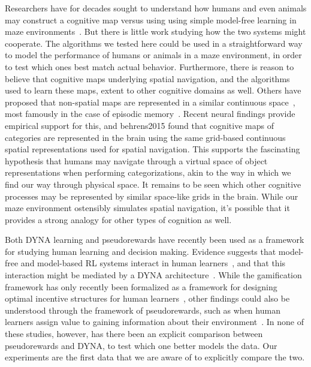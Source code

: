 \documentclass[notitlepage]{article}
\begin{document}
Researchers have for decades sought to understand how humans and even animals may construct a cognitive map versus using using simple model-free learning in maze environments~\cite{tolman1948cognitive,}. But there is little work studying how the two systems might cooperate. The algorithms we tested here could be used in a straightforward way to model the performance of humans or animals in a maze environment, in order to test which ones best match actual behavior. Furthermore, there is reason to believe that cognitive maps underlying spatial navigation, and the algorithms used to learn these maps, extent to other cognitive domains as well. Others have proposed that non-spatial maps are represented in a similar continuous space~\cite{buzsaki2013memory,tolman1948cognitive}, most famously in the case of episodic memory~\cite{o1978hippocampus}. Recent neural findings provide empirical support for this, and {behrens2015} found that cognitive maps of categories are represented in the brain using the same grid-based continuous spatial representations used for spatial navigation. This supports the fascinating hypothesis that humans may navigate through a virtual space of object representations when performing categorizations, akin to the way in which we find our way through physical space. It remains to be seen which other cognitive processes may be represented by similar space-like grids in the brain. While our maze environment ostensibly simulates spatial navigation, it's possible that it provides a strong analogy for other types of cognition as well.

Both DYNA learning and pseudorewards have recently been used as a framework for studying human learning and decision making. Evidence suggests that model-free and model-based RL systems interact in human learners~\cite{otto2013working,otto2013curse}, and that this interaction might be mediated by a DYNA architecture~\cite{gershman2014retrospective}. While the gamification framework has only recently been formalized as a framework for designing optimal incentive structures for human learners~\cite{lieder2016helping}, other findings could also be understood through the framework of pseudorewards, such as when human learners assign value to gaining information about their environment~\cite{wilson2014humans}. In none of these studies, however, has there been an explicit comparison between pseudorewards and DYNA, to test which one better models the data. Our experiments are the first data that we are aware of to explicitly compare the two.
\end{document}
